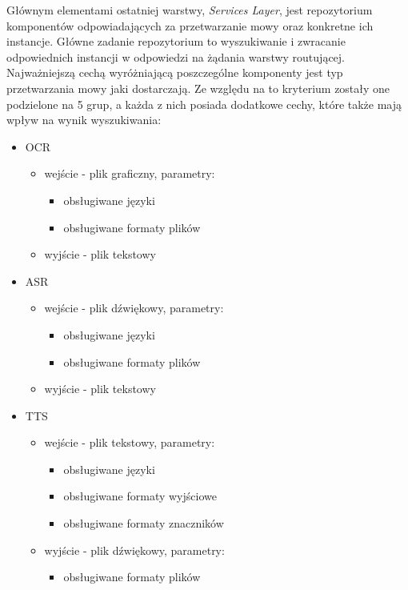 Głównym elementami ostatniej warstwy, \textit{Services Layer}, jest repozytorium komponentów odpowiadających za przetwarzanie mowy oraz konkretne ich instancje. Główne zadanie repozytorium to wyszukiwanie i zwracanie odpowiednich instancji w odpowiedzi na żądania warstwy routującej. Najważniejszą cechą wyróżniającą poszczególne komponenty jest typ przetwarzania mowy jaki dostarczają. Ze względu na to kryterium zostały one podzielone na 5 grup, a każda z nich posiada dodatkowe cechy, które także mają wpływ na wynik wyszukiwania:

\begin{itemize}
	\item OCR
	\begin{itemize}
		\item wejście - plik graficzny, parametry:
		\begin{itemize}
			\item obsługiwane języki 
			\item obsługiwane formaty plików
		\end{itemize}
		\item wyjście - plik tekstowy
	\end{itemize}
	\item ASR
	\begin{itemize}
		\item wejście - plik dźwiękowy, parametry:
		\begin{itemize}
			\item obsługiwane języki 
			\item obsługiwane formaty plików
		\end{itemize}
		\item wyjście - plik tekstowy
	\end{itemize}
	\item TTS
	\begin{itemize}
		\item wejście - plik tekstowy, parametry:
		\begin{itemize}
			\item obsługiwane języki 
			\item obsługiwane formaty wyjściowe
			\item obsługiwane formaty znaczników
		\end{itemize}
		\item wyjście - plik dźwiękowy, parametry:
		\begin{itemize}
			\item obsługiwane formaty plików
		\end{itemize}
	\end{itemize}

\end{itemize}

